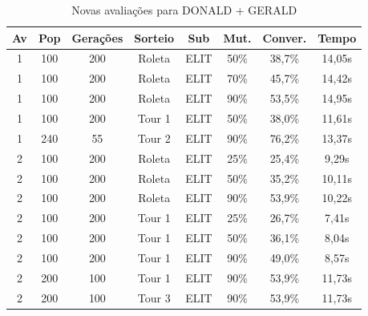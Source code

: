 \documentclass[a4paper, 12pt]{article}
\begin{document}
  \begin{table}[h]
    \centering
    \begin{tabular}{|c|c|c|c|c|c|c|c|}
      \hline
      Av & Pop & Gerações & Sorteio & Sub & Mut. & Conver. & Tempo  \\
      \hline
      1 & 100 & 200 & Roleta & ELIT & 50\% &38,7\% & 14,05s\\
      \hline
      1 & 100 & 200 & Roleta & ELIT & 70\% &45,7\% & 14,42s\\
      \hline
      1 & 100 & 200 & Roleta & ELIT & 90\% &53,5\% & 14,95s\\
      \hline
      1 & 100 & 200 & Tour 1 & ELIT & 50\% &38,0\% & 11,61s\\
      \hline
      1 & 240 & 55 & Tour 2 & ELIT & 90\% &76,2\% & 13,37s\\
      \hline
      2 & 100 & 200 & Roleta & ELIT & 25\% &25,4\% & 9,29s\\
      \hline
      2 & 100 & 200 & Roleta & ELIT & 50\% &35,2\% & 10,11s\\
      \hline
      2 & 100 & 200 & Roleta & ELIT & 90\% &53,9\% & 10,22s\\
      \hline
      2 & 100 & 200 & Tour 1 & ELIT & 25\% &26,7\% & 7,41s\\
      \hline
      2 & 100 & 200 & Tour 1 & ELIT & 50\% &36,1\% & 8,04s\\
      \hline
      2 & 100 & 200 & Tour 1 & ELIT & 90\% &49,0\% & 8,57s\\
      \hline
      2 & 200 & 100 & Tour 1 & ELIT & 90\% &53,9\% & 11,73s\\
      \hline
      2 & 200 & 100 & Tour 3 & ELIT & 90\% &53,9\% & 11,73s\\
      \hline
    \end{tabular}
    \caption{Novas avaliações para DONALD + GERALD}
    \label{tab:donald}
  \end{table}
\end{document}
